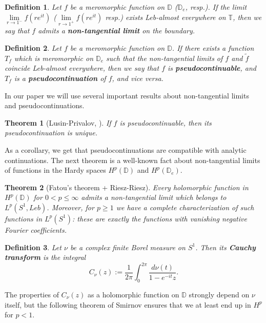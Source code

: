 \documentclass[11pt]{article}
\newtheorem{definition}{Definition}[section]
\newtheorem{theorem}{Theorem}[section]
\begin{document}
\begin{definition}
	Let $f$ be a meromorphic function on $\mathbb{D}$ ($\mathbb{D}_e$, resp.). If the limit $\lim\limits_{r \rightarrow 1^-} f(r e^{it})$ ($\lim\limits_{r \rightarrow 1^+} f(r e^{it})$ resp.) exists Leb-almost everywhere on $\mathbb{T}$, then we say that $f$ admits a \textbf{non-tangential limit} on the boundary.
\end{definition}

\begin{definition}
	Let $f$ be a meromorphic function on $\mathbb{D}$. If there exists a function $T_f$ which is meromorphic on $\mathbb{D}_e$ such that the non-tangential limits of $f$ and $\tilde{f}$ coincide Leb-almost everywhere, then we say that $f$ is \textbf{pseudocontinuable}, and $T_f$ is a \textbf{pseudocontinuation} of $f$, and vice versa.
\end{definition}

In our paper we will use several important results about non-tangential limits and pseudocontinuations.

\begin{theorem}[Lusin-Privalov, \cite{privalov1956randeigenschaften}]
	If $f$ is pseudocontinuable, then its pseudocontinuation is unique.
\end{theorem}

As a corollary, we get that pseudocontinuations are compatible with analytic continuations. The next theorem is a well-known fact about non-tangential limits of functions in the Hardy spaces $H^p(\mathbb{D})$ and $H^p(\mathbb{D}_e)$.

\begin{theorem}[Fatou's theorem + Riesz-Riesz]
	Every holomorphic function in $H^p(\mathbb{D})$ for $0 < p \le \infty$ admits a non-tangential limit which belongs to $L^p(S^1, Leb)$. Moreover, for $p \ge 1$ we have a complete characterization of such functions in $L^p(S^1)$: these are exactly the functions with vanishing negative Fourier coefficients.
\end{theorem}

\begin{definition}
	Let $\nu$ be a complex finite Borel measure on $S^1$. Then its \textbf{Cauchy transform} is the integral
	\[
	C_\nu(z) := \frac{1}{2\pi} \int_0^{2 \pi} \dfrac{d \nu(t)}{1 - e^{-it} z}.
	\]
\end{definition}

The properties of $C_\nu(z)$ as a holomorphic function on $\mathbb{D}$ strongly depend on $\nu$ itself, but the following theorem of Smirnov ensures that we at least end up in $H^p$ for $p < 1$.
\end{document}

